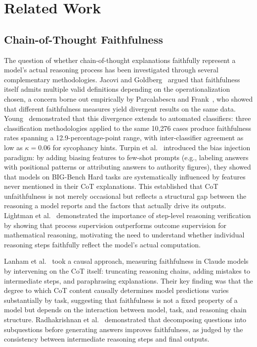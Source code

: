 
\section{Related Work}

\subsection{Chain-of-Thought Faithfulness}

The question of whether chain-of-thought explanations faithfully represent a model's
actual reasoning process has been investigated through several complementary
methodologies. Jacovi and Goldberg~\cite{jacovi2020faithfulness} argued that faithfulness itself admits multiple valid definitions depending on the operationalization chosen, a concern borne out empirically by Parcalabescu and Frank~\cite{parcalabescu2023measuring}, who showed that different faithfulness measures yield divergent results on the same data. Young~\cite{young2026classifier} demonstrated that this divergence extends to automated classifiers: three classification methodologies applied to the same 10,276 cases produce faithfulness rates spanning a 12.9-percentage-point range, with inter-classifier agreement as low as $\kappa = 0.06$ for sycophancy hints. Turpin et al.~\cite{turpin2023unfaithful} introduced the bias
injection paradigm: by adding biasing features to few-shot prompts (e.g., labeling
answers with positional patterns or attributing answers to authority figures), they
showed that models on BIG-Bench Hard tasks are systematically influenced by features
never mentioned in their CoT explanations. This established that CoT unfaithfulness
is not merely occasional but reflects a structural gap between the reasoning a model
reports and the factors that actually drive its outputs. Lightman et
al.~\cite{lightman2023verify} demonstrated the importance of step-level reasoning
verification by showing that process supervision outperforms outcome supervision
for mathematical reasoning, motivating the need to understand whether individual
reasoning steps faithfully reflect the model's actual computation.

Lanham et al.~\cite{lanham2023measuring} took a causal approach, measuring
faithfulness in Claude models by intervening on the CoT itself: truncating reasoning
chains, adding mistakes to intermediate steps, and paraphrasing explanations. Their
key finding was that the degree to which CoT content causally determines model
predictions varies substantially by task, suggesting that faithfulness is not a fixed
property of a model but depends on the interaction between model, task, and reasoning
chain structure. Radhakrishnan et al.~\cite{radhakrishnan2023decomposition}
demonstrated that decomposing questions into subquestions before generating answers
improves faithfulness, as judged by the consistency between intermediate reasoning
steps and final outputs.

